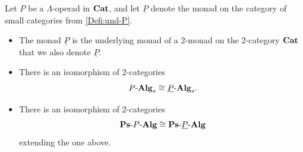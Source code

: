 \begin{thm}\label{thm:2monad=op}
Let $P$ be a $\Lambda$-operad in $\mathbf{Cat}$, and let $\underline{P}$ denote the monad on the category of small categories from \cref{Defi:und-P}.
\begin{itemize}
\item The monad $\underline{P}$ is the underlying monad of a 2-monad on the 2-category $\mathbf{Cat}$ that we also denote $\underline{P}$.
\item There is an isomorphism of $2$-categories
    \[
        P\mbox{-}\mathbf{Alg}_{s} \cong \underline{P}\mbox{-}\mathbf{Alg}_{s}.
    \]
\item There is an isomorphism of $2$-categories
    \[
        \mathbf{Ps}\mbox{-}P\mbox{-}\mathbf{Alg} \cong \mathbf{Ps}\mbox{-}\underline{P}\mbox{-}\mathbf{Alg}
    \]
    extending the one above.
\end{itemize}
\end{thm}
